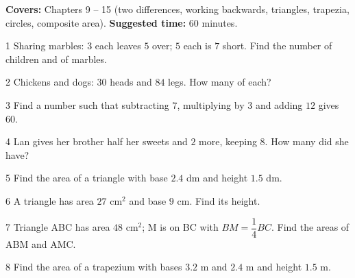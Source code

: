 \begin{knowbox}
\textbf{Covers:} Chapters 9 -- 15 (two differences, working backwards, triangles, trapezia, circles, composite area). \quad \textbf{Suggested time:} $60$ minutes.
\end{knowbox}
\gap
\begin{probbox}{1}{\relax}
Sharing marbles: $3$ each leaves $5$ over; $5$ each is $7$ short. Find the number of children and of marbles.
\end{probbox}
\gap
\begin{probbox}{2}{\relax}
Chickens and dogs: $30$ heads and $84$ legs. How many of each?
\end{probbox}
\gap
\begin{probbox}{3}{\relax}
Find a number such that subtracting $7$, multiplying by $3$ and adding $12$ gives $60$.
\end{probbox}
\gap
\begin{probbox}{4}{\relax}
Lan gives her brother half her sweets and $2$ more, keeping $8$. How many did she have?
\end{probbox}
\gap
\begin{probbox}{5}{\relax}
Find the area of a triangle with base $2.4$ dm and height $1.5$ dm.
\end{probbox}
\gap
\begin{probbox}{6}{\relax}
A triangle has area $27$ cm$^2$ and base $9$ cm. Find its height.
\end{probbox}
\gap
\begin{probbox}{7}{\relax}
Triangle ABC has area $48$ cm$^2$; M is on BC with $BM=\dfrac14BC$. Find the areas of ABM and AMC.
\end{probbox}
\gap
\begin{probbox}{8}{\relax}
Find the area of a trapezium with bases $3.2$ m and $2.4$ m and height $1.5$ m.
\end{probbox}

